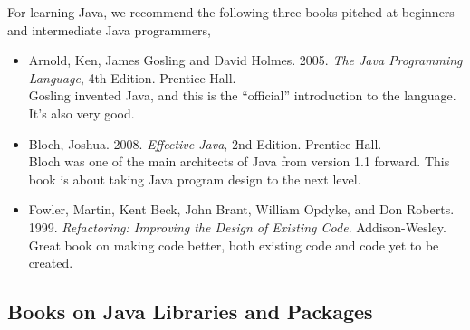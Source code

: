 For learning Java, we recommend the following three books pitched at
beginners and intermediate Java programmers,
%
\begin{itemize}
\item Arnold, Ken, James Gosling and David Holmes.  2005.
{\it The Java Programming Language}, 4th Edition.  Prentice-Hall.
\\
{\footnotesize Gosling invented Java, and this is the ``official'' introduction to the
language.  It's also very good.}
%
\item Bloch, Joshua. 2008. {\it Effective Java}, 2nd Edition.  Prentice-Hall.
\\
{\footnotesize Bloch was one of the main architects of Java from
version 1.1 forward.  This book is about taking Java program design
to the next level.}
%
\item
Fowler, Martin, Kent Beck, John Brant, William Opdyke, and Don Roberts.
1999.
{\it Refactoring: Improving the Design of Existing Code}.
Addison-Wesley.
\\
{\footnotesize Great book on making code better, both existing
code and code yet to be created.}
\end{itemize}
%

\subsection{Books on Java Libraries and Packages}

